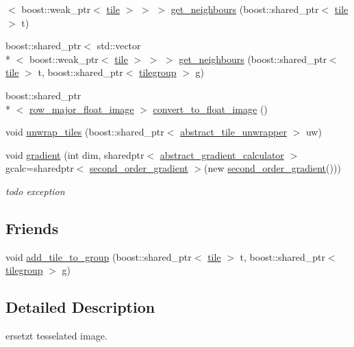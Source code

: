 \begin{DoxyCompactItemize}
$<$ boost\-::weak\-\_\-ptr$<$ \hyperlink{classtile}{tile} $>$ $>$ $>$ \hyperlink{classtiled__image_ae70cc88a06d95b9c7722b6a9a1425946}{get\-\_\-neighbours} (boost\-::shared\-\_\-ptr$<$ \hyperlink{classtile}{tile} $>$ t)
\item 
boost\-::shared\-\_\-ptr$<$ std\-::vector\\*
$<$ boost\-::weak\-\_\-ptr$<$ \hyperlink{classtile}{tile} $>$ $>$ $>$ \hyperlink{classtiled__image_ab6a7e4f4a35c611408574f61e78788c9}{get\-\_\-neighbours} (boost\-::shared\-\_\-ptr$<$ \hyperlink{classtile}{tile} $>$ t, boost\-::shared\-\_\-ptr$<$ \hyperlink{classtilegroup}{tilegroup} $>$ g)
\item 
boost\-::shared\-\_\-ptr\\*
$<$ \hyperlink{classrow__major__float__image}{row\-\_\-major\-\_\-float\-\_\-image} $>$ \hyperlink{classtiled__image_af07b3af38b336b89c632cd279a44800f}{convert\-\_\-to\-\_\-float\-\_\-image} ()
\item 
void \hyperlink{classtiled__image_a402abd626c8ea3b7ce6d55bb9944906e}{unwrap\-\_\-tiles} (boost\-::shared\-\_\-ptr$<$ \hyperlink{classabstract__tile__unwrapper}{abstract\-\_\-tile\-\_\-unwrapper} $>$ uw)
\item 
void \hyperlink{classtiled__image_a7ea93c1b5df0ff8b40394f38e2ee13be}{gradient} (int dim, sharedptr$<$ \hyperlink{classabstract__gradient__calculator}{abstract\-\_\-gradient\-\_\-calculator} $>$ gcalc=sharedptr$<$ \hyperlink{classsecond__order__gradient}{second\-\_\-order\-\_\-gradient} $>$(new \hyperlink{classsecond__order__gradient}{second\-\_\-order\-\_\-gradient}()))
\begin{DoxyCompactList}\small\item\em todo exception \end{DoxyCompactList}\end{DoxyCompactItemize}
\subsection*{Friends}
\begin{DoxyCompactItemize}
\item 
void \hyperlink{classtiled__image_ad9d048f39dc13c36b83a87295fdf75f9}{add\-\_\-tile\-\_\-to\-\_\-group} (boost\-::shared\-\_\-ptr$<$ \hyperlink{classtile}{tile} $>$ t, boost\-::shared\-\_\-ptr$<$ \hyperlink{classtilegroup}{tilegroup} $>$ g)
\end{DoxyCompactItemize}


\subsection{Detailed Description}
ersetzt tesselated image.

